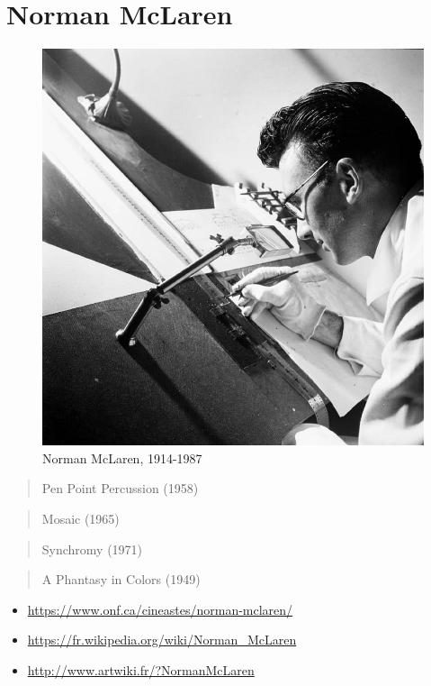 \documentclass[
  french,
]{book}
\providecommand{\tightlist}{%
  \setlength{\itemsep}{0pt}\setlength{\parskip}{0pt}}
\begin{document}
\hypertarget{norman-mclaren}{%
\section{Norman McLaren}\label{norman-mclaren}}

\begin{figure}
\centering
\includegraphics{medias/corpus/mclaren/Norman_McLaren_drawing_on_film_-_1944.jpg}
\caption{Norman McLaren, 1914-1987}
\end{figure}

\begin{quote}
Pen Point Percussion (1958)
\end{quote}

\begin{quote}
Mosaic (1965)
\end{quote}

\begin{quote}
Synchromy (1971)
\end{quote}

\begin{quote}
A Phantasy in Colors (1949)
\end{quote}

\begin{itemize}
\tightlist
\item
  \url{https://www.onf.ca/cineastes/norman-mclaren/}
\item
  \url{https://fr.wikipedia.org/wiki/Norman_McLaren}
\item
  \url{http://www.artwiki.fr/?NormanMcLaren}
\end{itemize}
\end{document}
